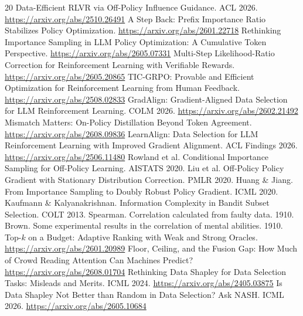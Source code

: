 \documentclass[11pt]{article}
\begin{document}
\begin{thebibliography}{20}
 Data-Efficient RLVR via Off-Policy Influence Guidance.
ACL 2026. \url{https://arxiv.org/abs/2510.26491}
 A Step Back: Prefix Importance Ratio
Stabilizes Policy Optimization. \url{https://arxiv.org/abs/2601.22718}
 Rethinking Importance Sampling in LLM Policy
Optimization: A Cumulative Token Perspective.
\url{https://arxiv.org/abs/2605.07331}
 Multi-Step Likelihood-Ratio Correction for
Reinforcement Learning with Verifiable Rewards.
\url{https://arxiv.org/abs/2605.20865}
 TIC-GRPO: Provable and Efficient Optimization for
Reinforcement Learning from Human Feedback.
\url{https://arxiv.org/abs/2508.02833}
 GradAlign: Gradient-Aligned Data Selection for
LLM Reinforcement Learning. COLM 2026.
\url{https://arxiv.org/abs/2602.21492}
 Mismatch Matters: On-Policy Distillation Beyond Token
Agreement. \url{https://arxiv.org/abs/2608.09836}
 LearnAlign: Data Selection for LLM
Reinforcement Learning with Improved Gradient Alignment. ACL Findings 2026.
\url{https://arxiv.org/abs/2506.11480}
 Rowland et al. Conditional Importance
Sampling for Off-Policy Learning. AISTATS 2020.
 Liu et al. Off-Policy Policy Gradient with
Stationary Distribution Correction. PMLR 2020.
 Huang \& Jiang. From Importance Sampling to
Doubly Robust Policy Gradient. ICML 2020.
 Kaufmann \& Kalyanakrishnan. Information
Complexity in Bandit Subset Selection. COLT 2013.
 Spearman. Correlation calculated from faulty
data. 1910.
 Brown. Some experimental results in the correlation
of mental abilities. 1910.
 Top-$k$ on a Budget: Adaptive Ranking with Weak and Strong
Oracles. \url{https://arxiv.org/abs/2601.20989}
 Floor, Ceiling, and the Fusion Gap: How
Much of Crowd Reading Attention Can Machines Predict?
\url{https://arxiv.org/abs/2608.01704}
 Rethinking Data Shapley for Data
Selection Tasks: Misleads and Merits. ICML 2024.
\url{https://arxiv.org/abs/2405.03875}
 Is Data Shapley Not Better than Random in Data
Selection? Ask NASH. ICML 2026. \url{https://arxiv.org/abs/2605.10684}
\end{thebibliography}
\end{document}
